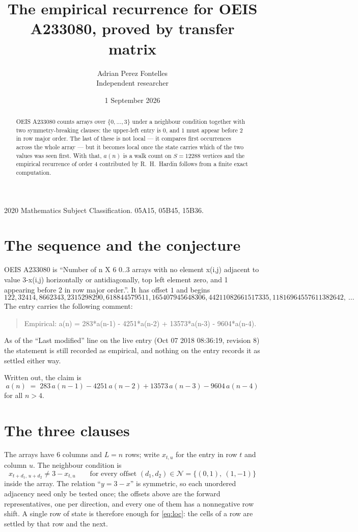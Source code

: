 \documentclass[11pt,a4paper]{article}
\title{The empirical recurrence for OEIS A233080, proved by transfer matrix}
\author{Adrian Perez Fontelles\\ \small Independent researcher}
\date{1 September 2026}
\theoremstyle{plain}
\theoremstyle{definition}
\begin{document}
\maketitle

\begin{abstract}
OEIS A233080 counts arrays over $\{0,\dots,3\}$ under a neighbour condition together with
two symmetry-breaking clauses: the upper-left entry is $0$, and $1$ must appear before
$2$ in row major order. The last of these is not local --- it compares first occurrences
across the whole array --- but it becomes local once the state carries which of the two values
was seen first. With that, $a(n)$ is a walk count on $S=12288$ vertices and the empirical
recurrence of order $4$ contributed by R.~H.~Hardin follows from a finite exact
computation.
\end{abstract}

\noindent\small 2020 Mathematics Subject Classification. 05A15, 05B45, 15B36.\normalsize

\section{The sequence and the conjecture}

OEIS A233080 is ``Number of n X 6 0..3 arrays with no element x(i,j) adjacent to value 3-x(i,j) horizontally or antidiagonally, top left element zero, and 1 appearing before 2 in row major order.''. It has offset $1$ and begins
\[
122, 32414, 8662343, 2315298290, 618844579511, 165407945648306, 44211082661517335, 11816964557611382642,\ \dots
\]
The entry carries the following comment:
\begin{quote}\small
Empirical: a(n) = 283*a(n-1) - 4251*a(n-2) + 13573*a(n-3) - 9604*a(n-4).
\end{quote}
As of the ``Last modified'' line on the live entry (Oct 07 2018 08:36:19, revision 8) the statement is
still recorded as empirical, and nothing on the entry records it as settled either way.

Written out, the claim is
\begin{equation}\label{eq:conj}
a(n)\;=\;283\,a(n-1) - 4251\,a(n-2) + 13573\,a(n-3) - 9604\,a(n-4)
\end{equation}
for all $n>4$.

\section{The three clauses}

The arrays have $6$ columns and $L=n$ rows; write $x_{t,u}$ for the entry in
row $t$ and column $u$. The neighbour condition is
\begin{equation}\label{eq:loc}
x_{t+d_1,\,u+d_2}\ne 3-x_{t,u}\qquad\text{for every offset }(d_1,d_2)\in\mathcal N=\{(0,1),\ (1,-1)\}
\end{equation}
inside the array. The relation ``$y=3-x$'' is symmetric, so each unordered adjacency need
only be tested once; the offsets above are the forward representatives, one per direction,
and every one of them has a nonnegative row shift. A single row of state is therefore
enough for \eqref{eq:loc}: the cells of a row are settled by that row and the next.
\end{document}

